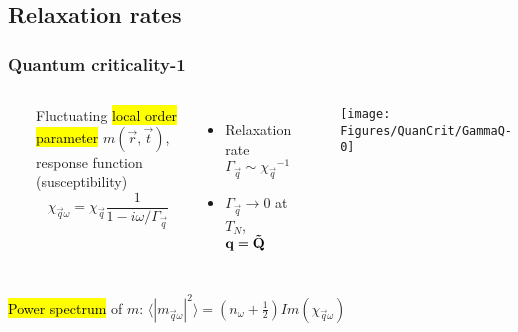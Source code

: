 \subsection{Relaxation rates}
\begin{frame}[label=quancrit1]
\frametitle{Quantum criticality-1}

\begin{columns}[t]
\centerline{~}

Fluctuating \hl{local order parameter} $m(\vec r, \vec t)$, response
function (susceptibility)
\[ \chi_{\vec q \omega} = \chi_{\vec q} \frac{1}{1-i\omega/\Gamma_\vec q} \]

\begin{itemize}
\item Relaxation rate $\Gamma_\vec q \sim {\chi_\vec q}^{-1}$
\item $\Gamma_\vec q \rightarrow 0$ at $T_N$, $\bf q=\vec Q$
\end{itemize}

\centerline{~}
\texttt{[image: \\Figures/QuanCrit/GammaQ-0]}
\end{columns}

\vspace{4ex}
\centerline{\hl{Power spectrum} of $m$:
$\langle |m_{\vec q\omega}|^2 \rangle = \left(n_\omega + \frac{1}{2}\right) Im(\chi_{\vec q \omega})$}

\end{frame}



